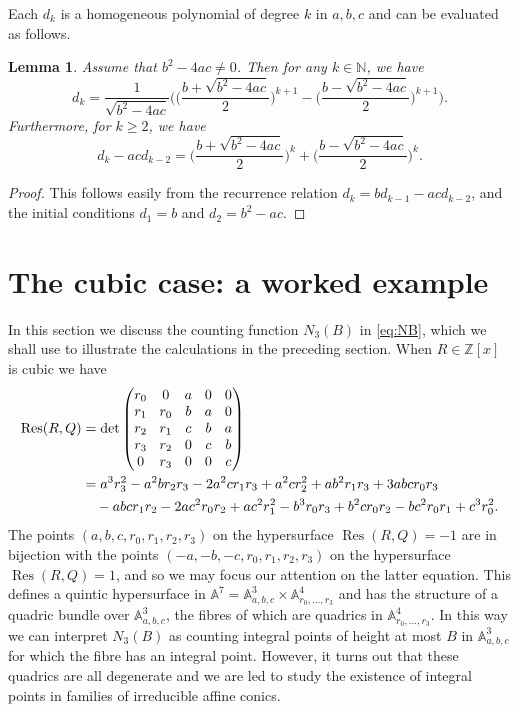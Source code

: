 \documentclass[JEP,XML,SOM,Unicode]{cedram}
\DeclareMathOperator{\Res}{Res}
\newcommand{\NN}{\mathbb{N}}
\newcommand{\ZZ}{\mathbb{Z}}\let\Z\ZZ
\newtheorem{lemma}[theorem]{Lemma}
\begin{document}
Each $d_k$ is a homogeneous polynomial of degree $k$ in $a,b,c$ and can be evaluated as follows.

\begin{lemma}\label{lem:res3}
Assume that $b^2-4ac\neq 0$.
Then for any $k\in \NN$, we have
\[
d_k=\frac{1}{\sqrt{b^2-4ac}}\biggl(\biggl(\frac{b+\sqrt{b^2-4ac}}{2}\biggr)^{k+1}-\biggl(\frac{b-\sqrt{b^2-4ac}}{2}\biggr)^{k+1}\biggr).
\]
Furthermore, for $k\geq 2$, we have
\[
d_k-acd_{k-2}=\biggl(\frac{b+\sqrt{b^2-4ac}}{2}\biggr)^{k}+\biggl(\frac{b-\sqrt{b^2-4ac}}{2}\biggr)^{k}.
\]
\end{lemma}
\begin{proof}
This follows easily from the recurrence relation $d_k=bd_{k-1}-acd_{k-2}$, and the initial conditions $d_{1}=b$ and $d_2=b^2-ac$.
\end{proof}

\section{The cubic case: a worked example}\label{s:3}

In this section we
discuss the counting function $N_3(B)$ in \eqref{eq:NB},
which we shall use to
illustrate the calculations in the preceding section.
When $R\in \ZZ[x]$ is cubic we have
\begin{align*}
\Res(R,Q)
&\arraycolsep4.5pt=
\det
\begin{pmatrix}
r_0 & 0 & a& 0& 0 \\
r_1 & r_0& b& a& 0 \\
r_2 & r_1& c& b& a \\
r_3 & r_2& 0& c& b \\
0 & r_3& 0& 0& c \\
\end{pmatrix}\\
&=a^3 r_3^2
-a^2 b r_2 r_3-2 a^2 c r_1 r_3 + a^2 c r_2^2+
a b^2 r_1 r_3 + 3 a b c r_0 r_3 \\
&\quad - a b c r_1 r_2 - 2 a c^2 r_0 r_2 +
a c^2 r_1^2
-b^3 r_0 r_3 + b^2 c r_0 r_2-b c^2 r_0 r_1 + c^3 r_0^2.
\end{align*}
The points $(a,b,c,r_0,r_1,r_2,r_3)$ on the hypersurface
$\Res(R,Q)=-1$ are in bijection with the
points $(-a,-b,-c,r_0,r_1,r_2,r_3)$ on the hypersurface
$\Res(R,Q)=1$, and so we may focus our attention on the latter equation.
This
defines a quintic hypersurface in $\mathbb{A}^7=\mathbb{A}_{a,b,c}^3\times \mathbb{A}_{r_0,\dots,r_3}^4$ and has the structure of a quadric bundle over $\mathbb{A}_{a,b,c}^3$, the fibres of which are quadrics in $\mathbb{A}_{r_0,\dots,r_3}^4$. In this way we can interpret $N_3(B)$ as counting integral points of height at most $B$ in $\mathbb{A}_{a,b,c}^3$ for which the fibre has
an integral point. However, it turns out that these quadrics are all degenerate and we are led to study
the existence of integral points in families of
irreducible affine conics.
\end{document}
